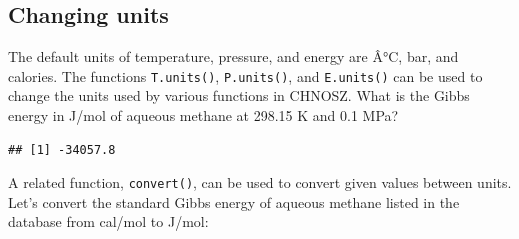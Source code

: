 \documentclass[]{tufte-handout}
\newenvironment{Shaded}{}{}
\newcommand{\KeywordTok}[1]{\textcolor[rgb]{0.00,0.44,0.13}{\textbf{#1}}}
\newcommand{\DataTypeTok}[1]{\textcolor[rgb]{0.56,0.13,0.00}{#1}}
\newcommand{\DecValTok}[1]{\textcolor[rgb]{0.25,0.63,0.44}{#1}}
\newcommand{\FloatTok}[1]{\textcolor[rgb]{0.25,0.63,0.44}{#1}}
\newcommand{\StringTok}[1]{\textcolor[rgb]{0.25,0.44,0.63}{#1}}
\newcommand{\OtherTok}[1]{\textcolor[rgb]{0.00,0.44,0.13}{#1}}
\newcommand{\OperatorTok}[1]{\textcolor[rgb]{0.40,0.40,0.40}{#1}}
\newcommand{\NormalTok}[1]{#1}
\begin{document}
\begin{Shaded}
\end{Shaded}

\subsection{Changing units}\label{changing-units}

The default units of temperature, pressure, and energy are Â°C, bar, and
calories. The functions {\texttt{T.units()}}, {\texttt{P.units()}}, and
{\texttt{E.units()}} can be used to change the units used by various
functions in CHNOSZ. What is the Gibbs energy in J/mol of aqueous
methane at 298.15 K and 0.1 MPa?

\begin{Shaded}
\end{Shaded}

\begin{verbatim}
## [1] -34057.8
\end{verbatim}

A related function, {\texttt{convert()}}, can be used to convert given
values between units. Let's convert the standard Gibbs energy of aqueous
methane listed in the database from cal/mol to J/mol:
\end{document}
